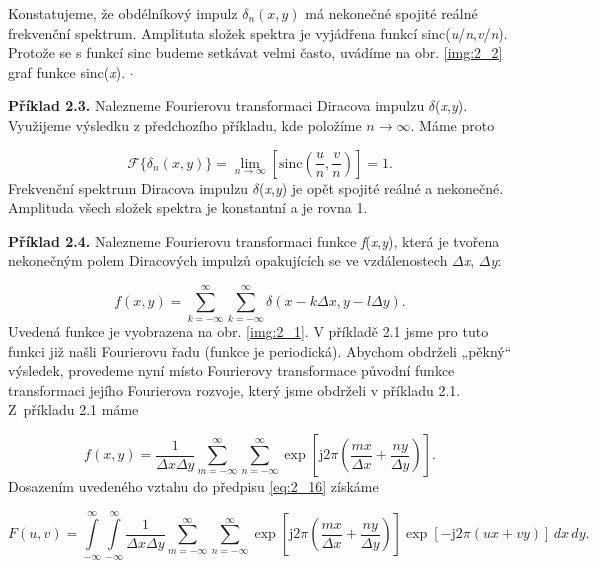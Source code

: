 Konstatujeme, že obdélníkový impulz $\delta_n(x, y)$ má nekonečné spojité reálné frekvenční spektrum. Amplituta složek spektra je vyjádřena funkcí sinc(\textit{u}/\textit{n},\textit{v}/\textit{n}). Protože se s funkcí sinc budeme setkávat velmi často, uvádíme na obr. \ref{img:2_2} graf funkce sinc(\textit{x}).  $\cdot$

\noindent \textbf{Příklad 2.3.} Nalezneme Fourierovu transformaci Diracova impulzu $\delta$(\textit{x},\textit{y}). Využijeme výsledku z předchozího příkladu, kde položíme $n \rightarrow \infty$. Máme proto

\begin{equation}
    \mathscr{F} \{ \delta_n(x, y) \} = \lim\limits_{n \rightarrow \infty} \left[ \mathrm{sinc} \left( \frac{u}{n}, \frac{v}{n} \right) \right] = 1.
\end{equation}
Frekvenční spektrum Diracova impulzu $\delta$(\textit{x},\textit{y}) je opět spojité reálné a nekonečné. Amplituda všech složek spektra je konstantní a je rovna 1.

\noindent \textbf{Příklad 2.4.} Nalezneme Fourierovu transformaci funkce \textit{f}(\textit{x},\textit{y}), která je tvořena nekonečným polem Diracových impulzů opakujících se ve vzdálenostech $\Delta$\textit{x}, $\Delta$\textit{y}:

\begin{equation}
    f(x, y) = \sum\limits_{k=-\infty}^{\infty} \sum\limits_{k=-\infty}^{\infty} \delta(x - k\Delta x, y - l\Delta y).\nonumber
\end{equation}
Uvedená funkce je vyobrazena na obr. \ref{img:2_1}. V příkladě 2.1 jsme pro tuto funkci již našli Fourierovu řadu (funkce je periodická). Abychom obdrželi „pěkný`` výsledek, provedeme nyní místo Fourierovy transformace původní funkce transformaci jejího Fourierova rozvoje, který jsme obdrželi v příkladu 2.1. Z~příkladu 2.1 máme

\begin{equation}
    f(x, y) = \frac{1}{\Delta x \Delta y} \sum\limits_{m=-\infty}^{\infty} \sum\limits_{n=-\infty}^{\infty} \exp \left[ \mathrm{j} 2 \pi \left( \frac{mx}{\Delta x} + \frac{ny}{\Delta y} \right) \right].\nonumber
\end{equation}
Dosazením uvedeného vztahu do předpisu \eqref{eq:2_16} získáme

\begin{equation}
    F(u, v) = \int\limits_{-\infty}^{\infty} \int\limits_{-\infty}^{\infty} \frac{1}{\Delta x \Delta y} \sum\limits_{m=-\infty}^{\infty} \sum\limits_{n=-\infty}^{\infty} \exp \left[ \mathrm{j} 2 \pi \left( \frac{mx}{\Delta x} + \frac{ny}{\Delta y} \right) \right] \exp \left[ - \mathrm{j} 2 \pi (ux + vy) \right]\,dx\,dy.\nonumber
\end{equation}

